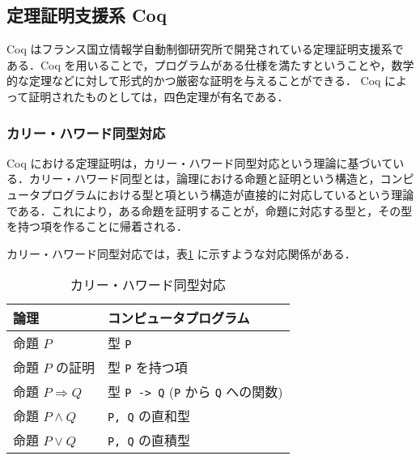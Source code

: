 \subsection{定理証明支援系 Coq}

Coq はフランス国立情報学自動制御研究所で開発されている定理証明支援系である\cite[Coq]{Coq}．Coq を用いることで，プログラムがある仕様を満たすということや，数学的な定理などに対して形式的かつ厳密な証明を与えることができる．
Coq によって証明されたものとしては，四色定理が有名である\cite[fourcolor]{fourcolor}．


\subsubsection{カリー・ハワード同型対応}

Coq における定理証明は，カリー・ハワード同型対応という理論に基づいている．カリー・ハワード同型とは，論理における命題と証明という構造と，コンピュータプログラムにおける型と項という構造が直接的に対応しているという理論である．これにより，ある命題を証明することが，命題に対応する型と，その型を持つ項を作ることに帰着される．

カリー・ハワード同型対応では，表\ref{tab:ch_iso} に示すような対応関係がある．

\begin{table}[tb]
  \caption{カリー・ハワード同型対応}
  \begin{center}
    \begin{tabular}{|ll|}
      \hline
      論理                   & コンピュータプログラム \\ \hline
      命題 $P$               & 型 {\tt P} \\
      命題 $P$ の証明        & 型 {\tt P} を持つ項 \\
      命題 $P \Rightarrow Q$ & 型 {\tt P -> Q} ({\tt P} から {\tt Q} への関数) \\
      命題 $P \wedge Q$      & {\tt P, Q} の直和型 \\
      命題 $P \vee Q$        & {\tt P, Q} の直積型 \\
      \hline
    \end{tabular}
    \label{tab:ch_iso}
  \end{center}
\end{table}


